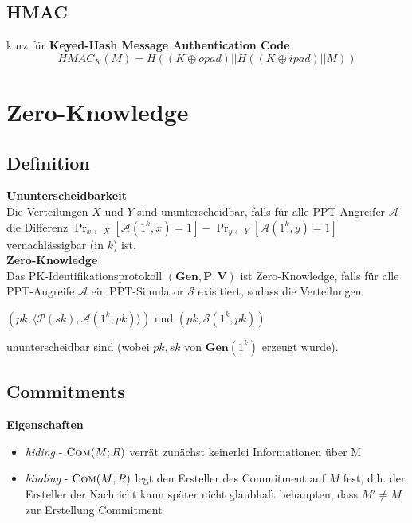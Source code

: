 \documentclass[10pt,a4paper]{article}
\begin{document}
        \subsection{HMAC}
        kurz für \textbf{Keyed-Hash Message Authentication Code} \\
        \[\mathit{HMAC}_{K}(M) = H((K \oplus \mathit{opad}) || H((K \oplus \mathit{ipad}) || M))\]
        \newpage

        \section{Zero-Knowledge}
        \subsection{Definition}
        \textbf{Ununterscheidbarkeit}\\
        Die Verteilungen \(X\) und \(Y\) sind ununterscheidbar, falls für alle PPT-Angreifer
        \(\mathcal{A}\) die Differenz
        \(\Pr_{x \leftarrow X}[\mathcal{A}(1^k, x) = 1] - \Pr_{y \leftarrow Y}[\mathcal{A}(1^k, y) = 1]\)
        vernachlässigbar (in \(k\)) ist.\\
        \textbf{Zero-Knowledge}\\
        Das PK-Identifikationsprotokoll \((\mathbf{Gen}, \mathbf{P}, \mathbf{V})\) ist Zero-Knowledge, falls für alle
        PPT-Angreife \(\mathcal{A}\) ein PPT-Simulator \(\mathcal{S}\) exisitiert, sodass die Verteilungen\\
        \begin{center}
          \((\mathit{pk}, \langle\mathcal{P}(\mathit{sk}),\mathcal{A}(1^k, \mathit{pk})\rangle)\)
          und
          \((\mathit{pk}, \mathcal{S}(1^k, \mathit{pk}))\)
        \end{center}
        ununterscheidbar sind (wobei \(\mathit{pk}, \mathit{sk}\) von \(\mathbf{Gen}(1^k)\) erzeugt wurde).
        \subsection{Commitments}
        \textbf{Eigenschaften}
        \begin{itemize}
        \item \textit{hiding} - \(\textsc{Com}(M; R)\) verrät zunächst keinerlei Informationen über M
        \item \textit{binding} - \(\textsc{Com}(M; R)\) legt den Ersteller des Commitment auf \(M\) fest, d.h.
          der Ersteller der Nachricht kann später nicht glaubhaft behaupten, dass \(M' \neq M\) zur Erstellung
          Commitment
        \end{itemize}
        \newpage
\end{document}
